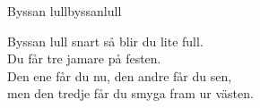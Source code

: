 \begin{song}{Byssan lull}{byssanlull}
\begin{vers}
Byssan lull snart så blir du lite full.\\
Du får tre jamare på festen.\\
Den ene får du nu, den andre får du sen,\\
men den tredje får du smyga fram ur västen.\\
\end{vers}
\end{song}
